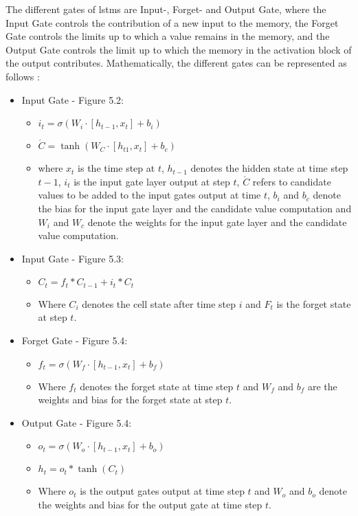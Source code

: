 \documentclass[a4paper, 11pt,titlepage,oneside,openany]{book}
\begin{document}
The different gates of \gls{lstm}s are Input-, Forget- and Output Gate, where the Input Gate controls the contribution of a new input to the memory, the Forget Gate controls the limits up to which a value remains in the memory, and the Output Gate controls the limit up to which the memory in the activation block of the output contributes. Mathematically, the different gates can be represented as follows \cite{rnn}: 
\begin{itemize}
	\item Input Gate - Figure 5.2: 
	\begin{itemize}
			\item $i_t=\sigma(W_i \cdot [h_{t-1}, x_t]+b_i)$
			\item $\acute{C}=\tanh(W_C \cdot [h_{t1}, x_t]+b_c)$
			\item where $x_t$ is the time step at $t$, $h_{t-1}$ denotes the hidden state at time step $t-1$, $i_t$ is the input gate layer output at step $t$, $\acute{C}$ refers to candidate values to be added to the input gates output at time $t$, $b_i$ and $b_c$ denote the bias for the input gate layer and the candidate value computation and $W_i$ and $W_c$ denote the weights for the input gate layer and the candidate value computation.
		\end{itemize}	
	\item  Input Gate - Figure 5.3:
	\begin{itemize}
		\item $C_t=f_t*C_{t-1}+i_t*C_t$
		\item Where $C_i$ denotes the cell state after time step $i$ and $F_t$ is the forget state at step $t$.
	\end{itemize}
	\item Forget Gate - Figure 5.4:
	\begin{itemize}
		\item $f_t=\sigma(W_f \cdot [h_{t-1}, x_t]+b_f)$
		\item Where $f_t$ denotes the forget state at time step $t$ and $W_f$ and $b_f$ are the weights and bias for the forget state at step $t$.
	\end{itemize}
	\item Output Gate - Figure 5.4:
	\begin{itemize}
		\item $o_t=\sigma(W_o \cdot [h_{t-1},x_t]+b_o)$
		\item $h_t=o_t*\tanh(C_t)$
		\item Where $o_t$ is the output gates output at time step $t$ and $W_o$ and $b_o$ denote the weights and bias for the output gate at time step $t$.
	\end{itemize}
\end{itemize}
\end{document}
